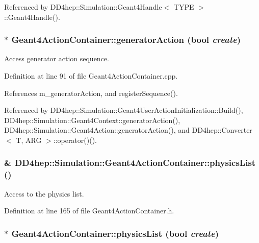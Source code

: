 Referenced by DD4hep::Simulation::Geant4Handle$<$ TYPE $>$::Geant4Handle().\hypertarget{class_d_d4hep_1_1_simulation_1_1_geant4_action_container_aac0430d56fb1bc7db0b71720c49033a4}{
\subsubsection[{generatorAction}]{ $\ast$ Geant4ActionContainer::generatorAction (bool {\em create})}}
\label{class_d_d4hep_1_1_simulation_1_1_geant4_action_container_aac0430d56fb1bc7db0b71720c49033a4}


Access generator action sequence. 

Definition at line 91 of file Geant4ActionContainer.cpp.

References m\_\-generatorAction, and registerSequence().

Referenced by DD4hep::Simulation::Geant4UserActionInitialization::Build(), DD4hep::Simulation::Geant4Context::generatorAction(), DD4hep::Simulation::Geant4Action::generatorAction(), and DD4hep::Converter$<$ T, ARG $>$::operator()().\hypertarget{class_d_d4hep_1_1_simulation_1_1_geant4_action_container_aaeb1188d7bf8338290d1d7080c5c2e18}{
\subsubsection[{physicsList}]{\& DD4hep::Simulation::Geant4ActionContainer::physicsList ()}}
\label{class_d_d4hep_1_1_simulation_1_1_geant4_action_container_aaeb1188d7bf8338290d1d7080c5c2e18}


Access to the physics list. 

Definition at line 165 of file Geant4ActionContainer.h.\hypertarget{class_d_d4hep_1_1_simulation_1_1_geant4_action_container_a78cbddc837b75f151cf76b483b588fb1}{
\subsubsection[{physicsList}]{ $\ast$ Geant4ActionContainer::physicsList (bool {\em create})}}
\label{class_d_d4hep_1_1_simulation_1_1_geant4_action_container_a78cbddc837b75f151cf76b483b588fb1}


